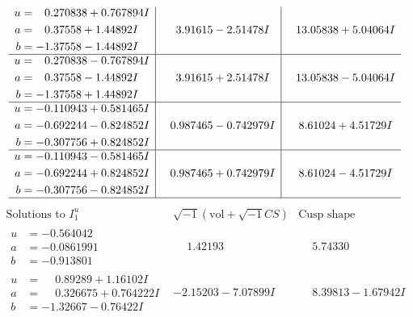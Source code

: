 \documentclass[1p]{elsarticle_modified}
\theoremstyle{definition}
\newcommand{\I}{\sqrt{-1}}
\begin{document}
$$\begin{array}{c|c|c}
\begin{aligned}
u &= \phantom{-}0.270838 + 0.767894 I \\
a &= \phantom{-}0.37558 + 1.44892 I \\
b &= -1.37558 - 1.44892 I\end{aligned}
 & \phantom{-}3.91615 - 2.51478 I & \phantom{-}13.05838 + 5.04064 I \\ \hline\begin{aligned}
u &= \phantom{-}0.270838 - 0.767894 I \\
a &= \phantom{-}0.37558 - 1.44892 I \\
b &= -1.37558 + 1.44892 I\end{aligned}
 & \phantom{-}3.91615 + 2.51478 I & \phantom{-}13.05838 - 5.04064 I \\ \hline\begin{aligned}
u &= -0.110943 + 0.581465 I \\
a &= -0.692244 - 0.824852 I \\
b &= -0.307756 + 0.824852 I\end{aligned}
 & \phantom{-}0.987465 - 0.742979 I & \phantom{-}8.61024 + 4.51729 I \\ \hline\begin{aligned}
u &= -0.110943 - 0.581465 I \\
a &= -0.692244 + 0.824852 I \\
b &= -0.307756 - 0.824852 I\end{aligned}
 & \phantom{-}0.987465 + 0.742979 I & \phantom{-}8.61024 - 4.51729 I\\
 \hline 
 \end{array}$$\newpage$$\begin{array}{c|c|c}  
\text{Solutions to }I^u_{1}& \I (\text{vol} + \sqrt{-1}CS) & \text{Cusp shape}\\
 \hline 
\begin{aligned}
u &= -0.564042\phantom{ +0.000000I} \\
a &= -0.0861991\phantom{ +0.000000I} \\
b &= -0.913801\phantom{ +0.000000I}\end{aligned}
 & \phantom{-}1.42193\phantom{ +0.000000I} & \phantom{-}5.74330\phantom{ +0.000000I} \\ \hline\begin{aligned}
u &= \phantom{-}0.89289 + 1.16102 I \\
a &= \phantom{-}0.326675 + 0.764222 I \\
b &= -1.32667 - 0.76422 I\end{aligned}
 & -2.15203 - 7.07899 I & \phantom{-}8.39813 - 1.67942 I \\ \hline\begin{aligned}

\end{aligned}
\end{array}$$
\end{document}
